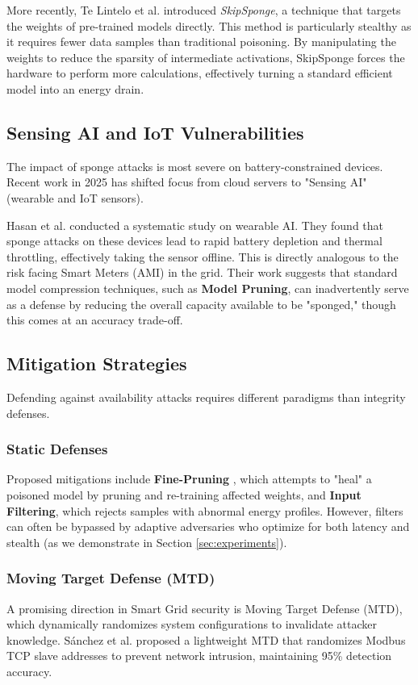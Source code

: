 More recently, Te Lintelo et al. \cite{telintelo2024skip} introduced \textit{SkipSponge}, a technique that targets the weights of pre-trained models directly. This method is particularly stealthy as it requires fewer data samples than traditional poisoning. By manipulating the weights to reduce the sparsity of intermediate activations, SkipSponge forces the hardware to perform more calculations, effectively turning a standard efficient model into an energy drain.

\subsection{Sensing AI and IoT Vulnerabilities}
The impact of sponge attacks is most severe on battery-constrained devices. Recent work in 2025 has shifted focus from cloud servers to "Sensing AI" (wearable and IoT sensors).

Hasan et al. \cite{hasan2025sensing} conducted a systematic study on wearable AI. They found that sponge attacks on these devices lead to rapid battery depletion and thermal throttling, effectively taking the sensor offline. This is directly analogous to the risk facing Smart Meters (AMI) in the grid. Their work suggests that standard model compression techniques, such as \textbf{Model Pruning}, can inadvertently serve as a defense by reducing the overall capacity available to be "sponged," though this comes at an accuracy trade-off.

\subsection{Mitigation Strategies}
Defending against availability attacks requires different paradigms than integrity defenses.

\subsubsection{Static Defenses}
Proposed mitigations include \textbf{Fine-Pruning} \cite{telintelo2024skip}, which attempts to "heal" a poisoned model by pruning and re-training affected weights, and \textbf{Input Filtering}, which rejects samples with abnormal energy profiles. However, filters can often be bypassed by adaptive adversaries who optimize for both latency and stealth (as we demonstrate in Section \ref{sec:experiments}).

\subsubsection{Moving Target Defense (MTD)}
A promising direction in Smart Grid security is Moving Target Defense (MTD), which dynamically randomizes system configurations to invalidate attacker knowledge. S{\'a}nchez et al. \cite{sanchez2025lightweight} proposed a lightweight MTD that randomizes Modbus TCP slave addresses to prevent network intrusion, maintaining 95\% detection accuracy.

